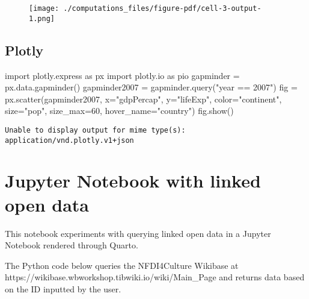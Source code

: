\documentclass[
  letterpaper,
  DIV=11,
  numbers=noendperiod]{scrreprt}
\newenvironment{Shaded}{\begin{snugshade}}{\end{snugshade}}
\newcommand{\DecValTok}[1]{\textcolor[rgb]{0.68,0.00,0.00}{#1}}
\newcommand{\ImportTok}[1]{\textcolor[rgb]{0.00,0.46,0.62}{#1}}
\newcommand{\NormalTok}[1]{\textcolor[rgb]{0.00,0.23,0.31}{#1}}
\newcommand{\OperatorTok}[1]{\textcolor[rgb]{0.37,0.37,0.37}{#1}}
\newcommand{\StringTok}[1]{\textcolor[rgb]{0.13,0.47,0.30}{#1}}
\begin{document}
\begin{figure}[H]

{\centering \texttt{[image: ./computations\_files/figure-pdf/cell-3-output-1.png]}

}

\end{figure}

\hypertarget{plotly}{%
\section{Plotly}\label{plotly}}

\begin{Shaded}
\begin{Highlighting}[]
\ImportTok{import}\NormalTok{ plotly.express }\ImportTok{as}\NormalTok{ px}
\ImportTok{import}\NormalTok{ plotly.io }\ImportTok{as}\NormalTok{ pio}
\NormalTok{gapminder }\OperatorTok{=}\NormalTok{ px.data.gapminder()}
\NormalTok{gapminder2007 }\OperatorTok{=}\NormalTok{ gapminder.query(}\StringTok{"year == 2007"}\NormalTok{)}
\NormalTok{fig }\OperatorTok{=}\NormalTok{ px.scatter(gapminder2007, }
\NormalTok{                 x}\OperatorTok{=}\StringTok{"gdpPercap"}\NormalTok{, y}\OperatorTok{=}\StringTok{"lifeExp"}\NormalTok{, color}\OperatorTok{=}\StringTok{"continent"}\NormalTok{, }
\NormalTok{                 size}\OperatorTok{=}\StringTok{"pop"}\NormalTok{, size\_max}\OperatorTok{=}\DecValTok{60}\NormalTok{,}
\NormalTok{                 hover\_name}\OperatorTok{=}\StringTok{"country"}\NormalTok{)}
\NormalTok{fig.show()}
\end{Highlighting}
\end{Shaded}

\begin{verbatim}
Unable to display output for mime type(s): application/vnd.plotly.v1+json
\end{verbatim}


\hypertarget{jupyter-notebook-with-linked-open-data}{%
\chapter{Jupyter Notebook with linked open
data}\label{jupyter-notebook-with-linked-open-data}}

This notebook experiments with querying linked open data in a Jupyter
Notebook rendered through Quarto.

The Python code below queries the NFDI4Culture Wikibase at
https://wikibase.wbworkshop.tibwiki.io/wiki/Main\_Page and returns data
based on the ID inputted by the user.
\end{document}
